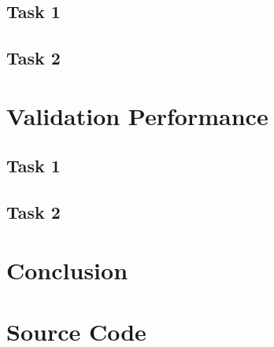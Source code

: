 \documentclass{article}
\begin{document}
\subsection{Task 1}
\label{sec:imp-1}

\subsection{Task 2}
\label{sec:imp-2}

\section{Validation Performance}
\label{sec:val}

\subsection{Task 1}
\label{sec:val-1}

\subsection{Task 2}
\label{sec:val-2}

\section{Conclusion}
\label{sec:conclusion}

\clearpage



\appendix

\section{Source Code}
\label{sec:source-code}
\end{document}
